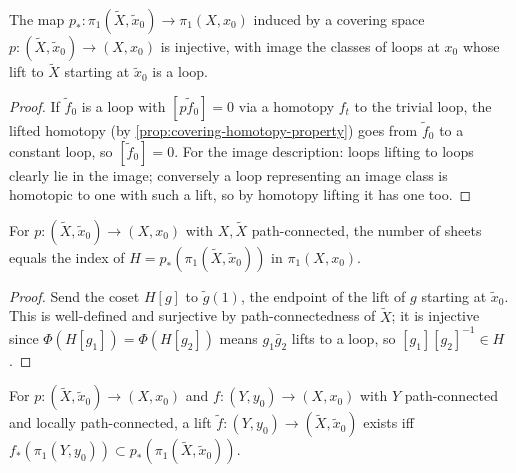 \begin{proposition}
\label{prop:covering-map-pi1-injective}
The map $p_* : \pi_1(\tilde X,\tilde x_0) \to \pi_1(X,x_0)$ induced by a covering space
$p : (\tilde X,\tilde x_0) \to (X,x_0)$ is injective, with image the classes of loops at $x_0$
whose lift to $\tilde X$ starting at $\tilde x_0$ is a loop.
\end{proposition}

\begin{proof}
If $\tilde f_0$ is a loop with $[p\tilde f_0]=0$ via a homotopy $f_t$ to the trivial loop, the
lifted homotopy (by \cref{prop:covering-homotopy-property}) goes from $\tilde f_0$ to a
constant loop, so $[\tilde f_0]=0$. For the image description: loops lifting to loops
clearly lie in the image; conversely a loop representing an image class is homotopic
to one with such a lift, so by homotopy lifting it has one too.
\end{proof}

\begin{proposition}
\label{prop:covering-sheets-equals-index}
For $p:(\tilde X,\tilde x_0)\to(X,x_0)$ with $X,\tilde X$ path-connected, the number of
sheets equals the index of $H = p_*(\pi_1(\tilde X,\tilde x_0))$ in $\pi_1(X,x_0)$.
\end{proposition}

\begin{proof}
Send the coset $H[g]$ to $\tilde g(1)$, the endpoint of the lift of $g$ starting at
$\tilde x_0$. This is well-defined and surjective by path-connectedness of $\tilde X$; it is
injective since $\Phi(H[g_1])=\Phi(H[g_2])$ means $g_1\bar g_2$ lifts to a loop, so
$[g_1][g_2]^{-1}\in H$.
\end{proof}

\begin{proposition}
\label{prop:covering-lifting-criterion}
For $p:(\tilde X,\tilde x_0)\to(X,x_0)$ and $f:(Y,y_0)\to(X,x_0)$ with $Y$
path-connected and locally path-connected, a lift $\tilde f:(Y,y_0)\to(\tilde X,\tilde x_0)$
exists iff $f_*(\pi_1(Y,y_0)) \subset p_*(\pi_1(\tilde X,\tilde x_0))$.
\end{proposition}

